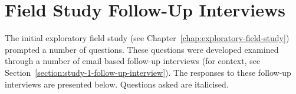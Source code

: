 \begin{center}
\end{center}

\chapter{Field Study Follow-Up Interviews}
\label{appendix:field-study-follow-up-interviews}

The initial exploratory field study (see Chapter~\ref{chap:exploratory-field-study}) prompted a number of questions. These questions were developed examined through a number of email based follow-up interviews (for context, see Section~\ref{section:study-1-follow-up-interview}). The responses to these follow-up interviews are presented below. Questions asked are italicised.



